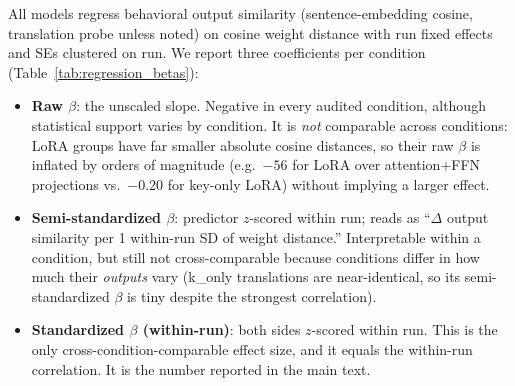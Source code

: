 \documentclass{article}
\theoremstyle{definition}
\theoremstyle{plain}
\begin{document}
All models regress behavioral output similarity (sentence-embedding cosine, translation probe
unless noted) on cosine weight distance with run fixed effects and SEs clustered on run. We report
three coefficients per condition (Table~\ref{tab:regression_betas}):
\begin{itemize}
  \item \textbf{Raw $\beta$}: the unscaled slope. Negative in every audited condition, although
    statistical support varies by condition. It is
    \emph{not} comparable across conditions: LoRA groups have far smaller absolute cosine distances,
    so their raw $\beta$ is inflated by orders of magnitude (e.g.\ $-56$ for LoRA over attention+FFN
    projections vs.\ $-0.20$ for key-only LoRA) without implying a larger effect.
  \item \textbf{Semi-standardized $\beta$}: predictor $z$-scored within run; reads as ``$\Delta$
    output similarity per 1 within-run SD of weight distance.'' Interpretable within a condition,
    but still not cross-comparable because conditions differ in how much their \emph{outputs} vary
    (k\_only translations are near-identical, so its semi-standardized $\beta$ is tiny despite the
    strongest correlation).
  \item \textbf{Standardized $\beta$ (within-run)}: both sides $z$-scored within run. This is the
    only cross-condition-comparable effect size, and it equals the within-run correlation. It is the
    number reported in the main text.
\end{itemize}
\end{document}
